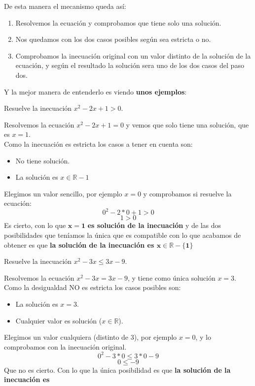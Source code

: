 \documentclass[a4paper,11pt,answers]{exam}
\newcommand{\realset}{\mathbb{R}}
\begin{document}
De esta manera el mecanismo queda así:
\begin{enumerate}
\item Resolvemos la ecuación y comprobamos que tiene solo una solución.
\item Nos quedamos con los dos casos posibles según sea estricta o no.
\item Comprobamos la inecuación original con un valor distinto de la solución de la ecuación, y
  según el resultado la solución sera uno de los dos casos del paso dos.
\end{enumerate}

Y la mejor manera de entenderlo es viendo \textbf{unos ejemplos}:
\begin{questions}
\question Resuelve la inecuación $x^2 -2x + 1 > 0$.
  \begin{solution}
    Resolvemos la ecuación $x^2 - 2x +1 = 0$ y vemos que solo tiene una solución, que es $x = 1$.\\
    Como la inecuación es estricta los casos a tener en cuenta son:
    \begin{itemize}
    \item No tiene solución.
    \item La solución es $x \in \realset - {1}$
    \end{itemize}
    Elegimos un valor sencillo, por ejemplo $x=0$ y comprobamos si resuelve la ecuación:
    \[0^2 - 2*0 + 1 > 0\]
    \[1 > 0\]
    Es cierto, con lo que $\boldsymbol{x = 1}$ \textbf{es solución de la inecuación} y de las
    dos posibilidades que teníamos la única que es compatible con lo que acabamos de obtener es que
    \textbf{la solución de la inecuación es $\boldsymbol{x \in \realset - \{1\}}$}
  \end{solution}
\question Resuelve la inecuación $x^2 -3x \leq 3x - 9$.
  \begin{solution}
    Resolvemos la ecuación $x^2 - 3x = 3x - 9$, y tiene como única solución $x = 3$.\\
    Como la desigualdad NO es estricta los casos posibles son:
    \begin{itemize}
    \item La solución es $x = 3$.
    \item Cualquier valor es solución ($x \in \realset$).
    \end{itemize}
    Elegimos un valor cualquiera (distinto de $3$), por ejemplo $x = 0$,
    y lo comprobamos con la inecuación original.
    \[0^2 - 3*0 \leq 3*0 - 9\]
    \[0 \leq -9\]
    Que no es cierto. Con lo que la única posibilidad es que \textbf{la solución de la inecuación es
}
\end{solution}
\end{questions}
\end{document}
